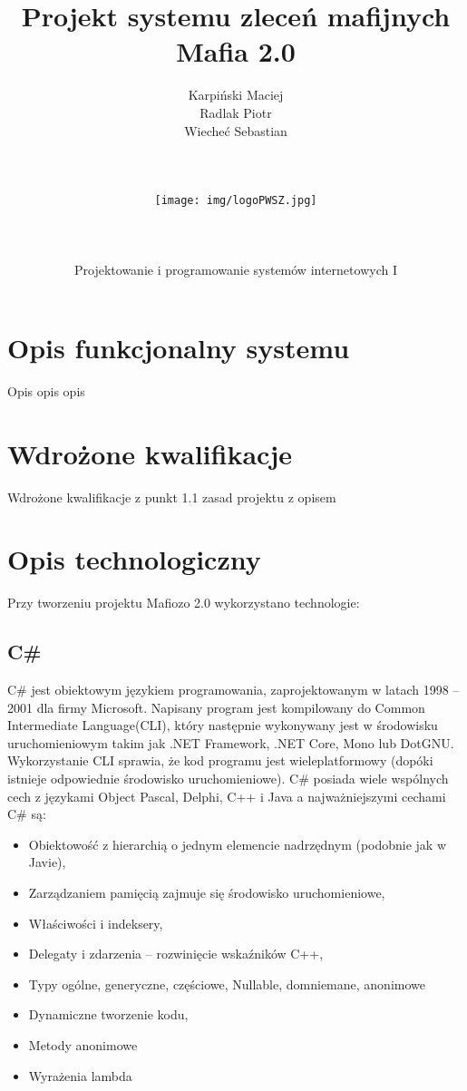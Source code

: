 \documentclass[12pt,a4paper]{article}
\author{Karpiński Maciej\\Radlak Piotr\\Wiecheć Sebastian\\\\\\\\\texttt{[image: img/logoPWSZ.jpg]}\\\\\\\\Projektowanie i programowanie systemów internetowych I}
\title{Projekt systemu zleceń mafijnych\\Mafia 2.0}
\begin{document}
	\maketitle
	\newpage

	\tableofcontents
	\newpage

	\section{Opis funkcjonalny systemu}
		Opis opis opis
	
	\section{Wdrożone kwalifikacje}
		Wdrożone kwalifikacje z punkt 1.1 zasad projektu z opisem
	
	\section{Opis technologiczny}
		Przy tworzeniu projektu Mafiozo 2.0 wykorzystano technologie:

		\subsection{C\#}
			C\# jest obiektowym językiem programowania, zaprojektowanym w latach 1998 – 2001 dla firmy Microsoft.
			Napisany program jest kompilowany do Common Intermediate Language(CLI), który następnie wykonywany jest w środowisku uruchomieniowym takim jak .NET Framework,
			.NET Core, Mono lub DotGNU.
			Wykorzystanie CLI sprawia, że kod programu jest wieleplatformowy (dopóki istnieje odpowiednie środowisko uruchomieniowe).
			C\# posiada wiele wspólnych cech z językami Object Pascal, Delphi, C++ i Java a najważniejszymi cechami C\# są:
			\begin{itemize}
				\item Obiektowość z hierarchią o jednym elemencie nadrzędnym (podobnie jak w Javie),
				\item Zarządzaniem pamięcią zajmuje się środowisko uruchomieniowe,
				\item Właściwości i indeksery,
				\item Delegaty i zdarzenia – rozwinięcie wskaźników C++,
				\item Typy ogólne, generyczne, częściowe, Nullable, domniemane, anonimowe
				\item Dynamiczne tworzenie kodu,
				\item Metody anonimowe
				\item Wyrażenia lambda
			\end{itemize}
			
\end{document}
